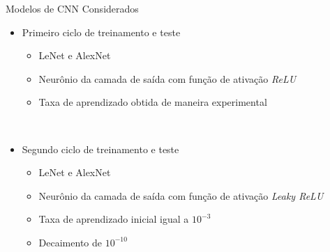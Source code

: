 \begin{frame}{Modelos de CNN Considerados}
     \begin{itemize}
          \item \alert{Primeiro ciclo de treinamento e teste}
          \begin{itemize}
               \item LeNet e AlexNet
               \item Neurônio da camada de saída com função de ativação \emph{ReLU}
               \item Taxa de aprendizado obtida de maneira experimental
          \end{itemize}
          \ \ \newline
          \item \alert{Segundo ciclo de treinamento e teste}
          \begin{itemize}
               \item LeNet e AlexNet
               \item Neurônio da camada de saída com função de ativação \emph{Leaky ReLU}
               \item Taxa de aprendizado inicial igual a $10^{-3}$
               \item Decaimento de $10^{-10}$
          \end{itemize}
     \end{itemize}
\end{frame}
